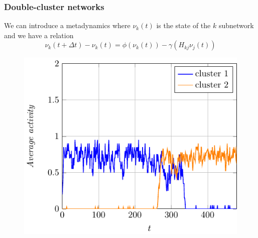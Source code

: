 \documentclass{beamer}
\begin{document}
\begin{frame}
\frametitle{Double-cluster networks}
We can introduce a metadynamics where $\nu_k(t)$ is the state of the $k$ subnetwork and
we have a relation
$$
\nu_k(t+\Delta t)-\nu_k(t)=\phi(\nu_k(t))-\gamma\left (H_{kj}\nu_j(t)\right )
$$
\begin{figure}
\includegraphics[scale=0.8]{images/metad.pdf}
\end{figure}
\end{frame}
\end{document}
